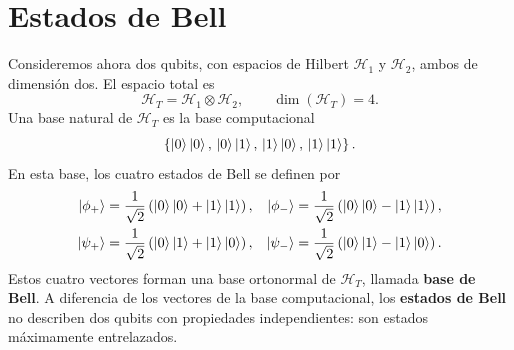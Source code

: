 \documentclass[12pt,a4paper]{article}
\theoremstyle{definition}
\theoremstyle{plain}
\theoremstyle{remark}
\newcommand{\Hil}{\mathcal{H}}
\begin{document}
\section{Estados de Bell}

Consideremos ahora dos qubits, con espacios de Hilbert $\Hil_1$ y $\Hil_2$, ambos de dimensión dos. El espacio total es
\begin{equation*}
    \Hil_T=\Hil_1\otimes\Hil_2,
    \qquad
    \dim(\Hil_T)=4.
\end{equation*}
Una base natural de $\Hil_T$ es la base computacional
\begin{equation*}
    \left\{
    \ket{0}\ket{0},\,
    \ket{0}\ket{1},\,
    \ket{1}\ket{0},\,
    \ket{1}\ket{1}
    \right\}.
\end{equation*}
En esta base, los cuatro estados de Bell se definen por
\begin{align*}
    \ket{\phi_+}&=\frac{1}{\sqrt{2}}\left(\ket{0}\ket{0}+\ket{1}\ket{1}\right),&
    \ket{\phi_-}&=\frac{1}{\sqrt{2}}\left(\ket{0}\ket{0}-\ket{1}\ket{1}\right),\\
    \ket{\psi_+}&=\frac{1}{\sqrt{2}}\left(\ket{0}\ket{1}+\ket{1}\ket{0}\right),&
    \ket{\psi_-}&=\frac{1}{\sqrt{2}}\left(\ket{0}\ket{1}-\ket{1}\ket{0}\right).
\end{align*}
Estos cuatro vectores forman una base ortonormal de $\Hil_T$, llamada \textbf{base de Bell}. A diferencia de los vectores de la base computacional, los \textbf{estados de Bell} no describen dos qubits con propiedades independientes: son estados máximamente entrelazados.
\end{document}
